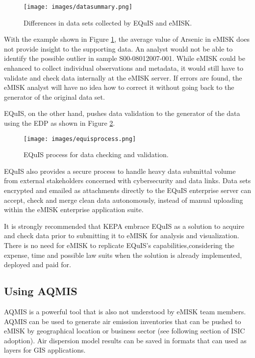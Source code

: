 \begin{figure}[H]
\centering
\texttt{[image: images/datasummary.png]} 
\caption{Differences in data sets collected by EQuIS and eMISK.}
\label{fig:datasummary}
\end{figure}

With the example shown in Figure \ref{fig:datasummary}, the average value of Arsenic in eMISK does not provide insight to the supporting data. An analyst would not be able to identify the possible outlier in sample S00-08012007-001. While eMISK could be enhanced to collect individual observations and metadata, it would still have to validate and check data internally at the eMISK server. If errors are found, the eMISK analyst will have no idea how to correct it without going back to the generator of the original data set.

EQuIS, on the other hand, pushes data validation to the generator of the data using the EDP as shown in Figure \ref{fig:equisprocess}.

\begin{figure}[H]
\centering
\texttt{[image: images/equisprocess.png]} 
\caption{EQuIS process for data checking and validation.}
\label{fig:equisprocess}
\end{figure}

EQuIS also provides a secure process to handle heavy data submittal volume from external stakeholders concerned with cybersecurity and data links. Data sets encrypted and emailed as attachments directly to the EQuIS enterprise server can accept, check and merge clean data autonomously, instead of manual uploading within the eMISK enterprise application suite.

It is strongly recommended that KEPA embrace EQuIS as a solution to acquire and check data prior to submitting it to eMISK for analysis and visualization. There is no need for eMISK to replicate EQuIS's capabilities,considering the expense, time and possible law suits when the solution is already implemented, deployed and paid for.

\subsection{Using AQMIS}

AQMIS is a powerful tool that is also not understood by eMISK team members. AQMIS can be used to generate air emission inventories that can be pushed to eMISK by geographical location or business sector (see following section of ISIC adoption). Air dispersion model results can be saved in formats that can used as layers for GIS applications.

